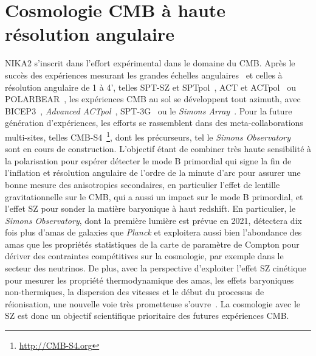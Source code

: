 %
%
%
%

%
%
%
%
%                 
%
%
%
\section{Cosmologie CMB à haute résolution angulaire}

NIKA2 s'inscrit dans l'effort expérimental dans le domaine du CMB. 
Après le succès des expériences mesurant les grandes échelles
angulaires~\citep[BICEP2 et Keck Array][]{BK2018} et celles à
résolution angulaire de 1 à 4', telles SPT-SZ et
SPTpol~\citep{deHaan2016, SPTpol2019}, ACT et
ACTpol~\citep{ACTpol2017, ACTpol2018} ou
POLARBEAR~\citep{Polarbear2017}, les expériences CMB au sol se
développent tout azimuth, avec BICEP3~\citep{BICEP3_2018},
\emph{Advanced ACTpol}~\citep{AdvACT2018}, SPT-3G~\citep{SPT3G_2018}
ou le \emph{Simons Array}~\citep{SA_2016}. Pour la future génération
d'expériences, les efforts se rassemblent dans des
meta-collaborations multi-sites, telles
CMB-S4~\footnote{\url{http://CMB-S4.org}}, dont les précurseurs, tel
le \emph{Simons Observatory}~\citep{SO2019} sont
en cours de construction. L'objectif étant de combiner très haute
sensibilité à la polarisation pour espérer détecter le mode B
primordial qui signe la fin de l'inflation et résolution angulaire de
l'ordre de la minute d'arc pour assurer une bonne mesure des
anisotropies secondaires, en particulier l'effet de lentille
gravitationnelle sur le CMB, qui a aussi un impact sur le mode B
primordial, et l'effet SZ pour sonder la matière baryonique à haut
redshift. En particulier, le \emph{Simons Observatory}, dont la
première lumière est prévue en 2021, détectera dix fois plus d'amas
de galaxies que \emph{Planck} et exploitera aussi bien l'abondance des
amas que les propriétés statistiques de la carte de paramètre de
Compton pour dériver des contraintes compétitives sur la cosmologie,
par exemple dans le secteur des neutrinos.  
De plus, avec la perspective d'exploiter l'effet SZ cinétique pour
mesurer les propriété thermodynamique des amas, les effets baryoniques
non-thermiques, la dispersion des vitesses et le début du processus de
réionisation, une nouvelle voie très prometteuse
s'ouvre~\citep{SO2019}. La cosmologie avec le SZ est donc un objectif
scientifique prioritaire des futures expériences CMB.

